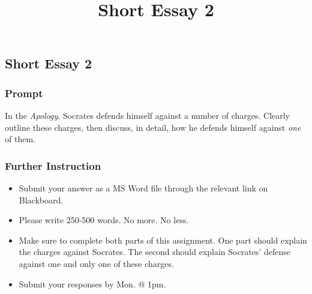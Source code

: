 \documentclass[]{article}
\title{Short Essay 2}
\date{}
\begin{document}
\maketitle

\subsection{Short Essay 2}\label{short-essay-2}

\subsubsection{Prompt}\label{prompt}

In the \emph{Apology}, Socrates defends himself against a number of
charges. Clearly outline these charges, then discuss, in detail, how he
defends himself against \emph{one} of them.

\subsubsection{Further Instruction}\label{further-instruction}

\begin{itemize}
\itemsep1pt\parskip0pt
\item
  Submit your answer as a MS Word file through the relevant link on
  Blackboard.
\item
  Please write 250-500 words. No more. No less.
\item
  Make sure to complete both parts of this assignment. One part should
  explain the charges against Socrates. The second should explain
  Socrates' defense against one and only one of these charges.
\item
  Submit your responses by Mon. @ 1pm.
\end{itemize}
\end{document}
